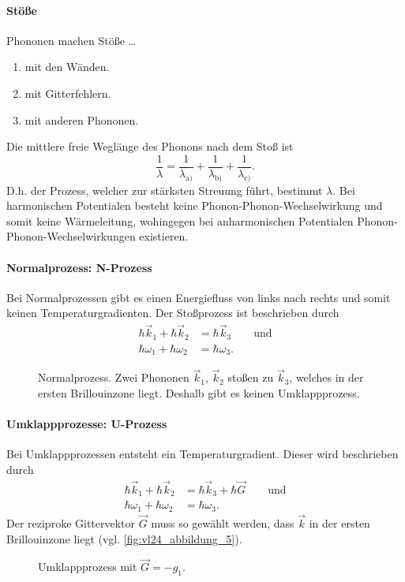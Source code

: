 \paragraph{Stöße} Phononen machen Stöße \ldots
	\begin{enumerate}[label=\alph*)]
		\item mit den Wänden.
		\item mit Gitterfehlern.
		\item mit anderen Phononen.
	\end{enumerate}
	Die mittlere freie Weglänge des Phonons nach dem Stoß ist
	$$
		\frac{1}{\lambda} = \frac{1}{\lambda_{\text{a)}}} + \frac{1}{\lambda_{\text{b)}}} + \frac{1}{\lambda_{\text{c)}}}.
	$$
	D.h. der Prozess, welcher zur stärksten Streuung führt, bestimmt $\lambda$.
	Bei harmonischen Potentialen besteht keine Phonon-Phonon-Wechselwirkung und somit keine Wärmeleitung, wohingegen bei anharmonischen Potentialen Phonon-Phonon-Wechselwirkungen existieren.

	

\paragraph{Normalprozess: N-Prozess} Bei Normalprozessen gibt es einen Energiefluss von links nach rechts und somit keinen Temperaturgradienten. Der Stoßprozess ist beschrieben durch
	$$		
		\begin{aligned}
			\hbar \Vec{k}_{1} + \hbar \Vec{k}_{2} &= \hbar \Vec{k}_{3} \qquad\text{und}\\
			\hbar \omega_{1} + \hbar \omega_{2} &= \hbar \omega_{3}.
		\end{aligned}
	$$ 
	\begin{figure}[H]
		\centering
		\caption{Normalprozess. Zwei Phononen $\vec k_1$, $\vec k_2$ stoßen zu $\vec k_3$, welches in der ersten Brillouinzone liegt. Deshalb gibt es keinen Umklappprozess.}
		\label{fig:vl24_abbildung_4}
	\end{figure}
	

\paragraph{Umklappprozesse: U-Prozess} Bei Umklappprozessen entsteht ein Temperaturgradient. Dieser wird beschrieben durch
	$$
		\begin{aligned}
			\hbar \Vec{k}_{1} + \hbar \Vec{k}_{2} &=  \hbar \Vec{k}_{3} + \hbar \Vec{G}\qquad\text{und}\\
			\hbar  \omega_1 + \hbar \omega_{2} &= \hbar \omega_3.
		\end{aligned}
	$$
	Der reziproke Gittervektor $\vec G$ muss so gewählt werden, dass $\vec k$ in der ersten Brillouinzone liegt (vgl. \autoref{fig:vl24_abbildung_5}).
	\begin{figure}[H]
		\centering
		\caption{Umklappprozess mit $\vec G=-g_1$.}
		\label{fig:vl24_abbildung_5}
	\end{figure}

